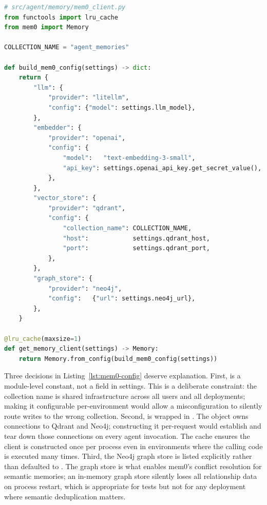 \begin{lstlisting}[language=Python,
  caption={build\_mem0\_config and singleton get\_memory\_client},
  label={lst:mem0-config}]
# src/agent/memory/mem0_client.py
from functools import lru_cache
from mem0 import Memory

COLLECTION_NAME = "agent_memories"

def build_mem0_config(settings) -> dict:
    return {
        "llm": {
            "provider": "litellm",
            "config": {"model": settings.llm_model},
        },
        "embedder": {
            "provider": "openai",
            "config": {
                "model":   "text-embedding-3-small",
                "api_key": settings.openai_api_key.get_secret_value(),
            },
        },
        "vector_store": {
            "provider": "qdrant",
            "config": {
                "collection_name": COLLECTION_NAME,
                "host":            settings.qdrant_host,
                "port":            settings.qdrant_port,
            },
        },
        "graph_store": {
            "provider": "neo4j",
            "config":   {"url": settings.neo4j_url},
        },
    }

@lru_cache(maxsize=1)
def get_memory_client(settings) -> Memory:
    return Memory.from_config(build_mem0_config(settings))
\end{lstlisting}

Three decisions in Listing~\ref{lst:mem0-config} deserve explanation. First,
 is a module-level constant, not a field in settings.
This is a deliberate constraint: the collection name is shared infrastructure
across all users and all deployments; making it configurable per-environment
would allow a misconfiguration to silently route writes to the wrong
collection. Second,  is wrapped in
. The  object owns connections to
Qdrant and Neo4j; constructing it per-request would establish and tear down
those connections on every agent invocation. The cache ensures the client is
constructed once per process even in environments where the calling code is
executed many times. Third, the Neo4j graph store is listed explicitly rather
than defaulted to . The graph store is what enables mem0's
conflict resolution for semantic memories; an in-memory graph store silently
loses all relationship data on process restart, which is appropriate for tests
but not for any deployment where semantic deduplication matters.

